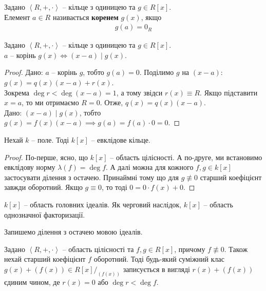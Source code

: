 \documentclass{math_library}
\begin{document}
\begin{definition}
Задано $\left< R,+,\cdot\right>$ -- кільце з одиницею та $g \in R[x]$.\\
Елемент $a \in R$ називається \textbf{коренем} $g(x)$, якщо 
\begin{align*}
g(a) = 0_R
\end{align*}
\end{definition}

\begin{proposition}
Задано $\left< R,+,\cdot\right>$ -- кільце з одиницею та $g \in R[x]$.\\
$a$ -- корінь $g(x) \iff (x-a) \mid g(x)$.
\end{proposition}

\begin{proof}
\rightproof Дано: $a$ -- корінь $g$, тобто $g(a) = 0$. Поділимо $g$ на $(x-a)$:\\
$g(x) = q(x)(x-a) + r(x)$.\\
Зокрема $\deg r < \deg (x-a) = 1$, а тому звідси $r(x) \equiv R$. Якщо підставити $x = a$, то ми отримаємо $R = 0$. Отже, $q(x) = q(x)(x-a)$.
\bigskip \\
\leftproof Дано: $(x-a) \mid g(x)$, тобто \\
$g(x) = f(x)(x-a) \implies g(a) = f(a) \cdot 0 = 0$.
\end{proof}

\begin{theorem}
Нехай $k$ -- поле. Тоді $k[x]$ -- евклідове кільце.
\end{theorem}

\begin{proof}
По-перше, ясно, що $k[x]$ -- область цілісності. А по-друге, ми встановимо евклідову норму $\lambda(f) = \deg f$. А далі можна для кожного $f,g \in k[x]$ застосувати ділення з остачею. Принаймні тому що для $g \not\equiv 0$ старший коефіцієнт завжди оборотний. Якщо $g \equiv 0$, то тоді $0 = 0 \cdot f(x) + 0$.
\end{proof}

\begin{corollary}
$k[x]$ -- область головних ідеалів. Як черговий наслідок, $k[x]$ -- область однозначної факторизації.
\end{corollary}

Запишемо ділення з остачею мовою ідеалів.
\begin{corollary}
Задано $\left< R,+,\cdot\right>$ -- область цілісності та $f,g \in R[x]$, причому $f \not\equiv 0$. Також нехай старший коефіцієнт $f$ оборотний. Тоді будь-який суміжний клас $g(x) + (f(x)) \in R[x]/_{(f(x))}$ записується в вигляді $r(x) + (f(x))$ єдиним чином, де $r(x) = 0$ або $\deg r < \deg f$.
\end{corollary}
\end{document}
